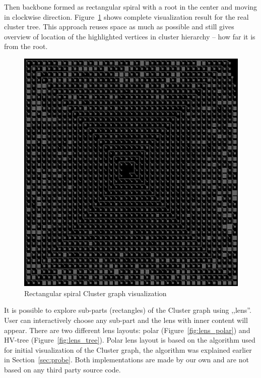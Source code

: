 Then backbone formed as rectangular spiral with a root in the center and moving in clockwise direction.
Figure~\ref{fig:cluster_visualisation} shows complete visualization result for the real cluster tree.
This approach reuses space as much as possible and still gives overview of location of the highlighted vertices in cluster hierarchy -- how far it is from the root.

\begin{figure}[h!]
\centering
\includegraphics[scale=0.4]{pictures/cluster_spiral_visualisation.png}
\caption{Rectangular spiral Cluster graph visualization}
\label{fig:cluster_visualisation}
\end{figure}

It is possible to explore sub-parts (rectangles) of the Cluster graph using ,,lens''. User can interactively choose any sub-part and the lens with inner content will appear.
There are two different lens layouts: polar (Figure~\ref{fig:lens_polar}) and HV-tree (Figure~\ref{fig:lens_tree}).
Polar lens layout is based on the algorithm used for initial visualization of the Cluster graph, the algorithm was explained earlier in Section~\ref{sec:probe}.
Both implementations are made by our own and are not based on any third party source code.

